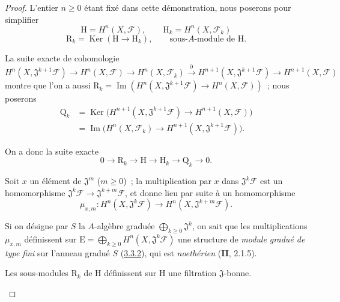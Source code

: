 \begin{proof}
L'entier $n\geq0$ étant fixé dans cette démonstration, nous poserons pour
simplifier
\[
\mathrm H=H^n(X,\mathcal F),\qquad
\mathrm H_k=H^n(X,\mathcal F_k)
\tag{4.1.7.3}\label{III.4.1.7.3-fr}
\]
\[
\mathrm R_k=\operatorname{Ker}(\mathrm H\longrightarrow\mathrm H_k),
\qquad\text{sous-$A$-module de $\mathrm H$.}
\tag{4.1.7.4}\label{III.4.1.7.4-fr}
\]

La suite exacte de cohomologie
\[
H^n(X,\mathfrak J^{k+1}\mathcal F)\longrightarrow H^n(X,\mathcal F)
\longrightarrow H^n(X,\mathcal F_k)\xrightarrow{\partial}
H^{n+1}(X,\mathfrak J^{k+1}\mathcal F)
\longrightarrow H^{n+1}(X,\mathcal F)
\]
montre que l'on a aussi
$\mathrm R_k=\operatorname{Im}(
H^n(X,\mathfrak J^{k+1}\mathcal F)\longrightarrow H^n(X,\mathcal F)
)$~;
nous poserons
\[
\begin{aligned}
\mathrm Q_k
&=\operatorname{Ker}\bigl(H^{n+1}(X,\mathfrak J^{k+1}\mathcal F)
\longrightarrow H^{n+1}(X,\mathcal F)\bigr)\\
&=\operatorname{Im}\bigl(H^n(X,\mathcal F_k)
\longrightarrow H^{n+1}(X,\mathfrak J^{k+1}\mathcal F)\bigr).
\end{aligned}
\tag{4.1.7.5}\label{III.4.1.7.5-fr}
\]

On a donc la suite exacte
\[
0\longrightarrow\mathrm R_k\longrightarrow\mathrm H
\longrightarrow\mathrm H_k\longrightarrow\mathrm Q_k\longrightarrow0.
\tag{4.1.7.6}\label{III.4.1.7.6-fr}
\]

\begin{env}[4.1.7.7]
\label{III.4.1.7.7-fr}
Soit $x$ un élément de $\mathfrak J^m$ ($m\geq0$)~; la multiplication par
$x$ dans $\mathfrak J^k\mathcal F$ est un homomorphisme
$\mathfrak J^k\mathcal F\to\mathfrak J^{k+m}\mathcal F$, et donne lieu
par suite à un homomorphisme
\[
\mu_{x,m}:H^n(X,\mathfrak J^k\mathcal F)
\longrightarrow H^n(X,\mathfrak J^{k+m}\mathcal F).
\tag{4.1.7.8}\label{III.4.1.7.8-fr}
\]

Si on désigne par $S$ la $A$-algèbre graduée
$\bigoplus_{k\geq0}\mathfrak J^k$, on sait que les multiplications
$\mu_{x,m}$ définissent sur
$\mathrm E=\bigoplus_{k\geq0}H^n(X,\mathfrak J^k\mathcal F)$ une
structure de \emph{module gradué de type fini} sur l'anneau gradué $S$
(\hyperref[III.3.3.2-fr]{3.3.2}), qui est \emph{noethérien} (\textbf{II}, 2.1.5).
\end{env}

\begin{lemma}[4.1.7.9]
\label{III.4.1.7.9-fr}
Les sous-modules $\mathrm R_k$ de $\mathrm H$ définissent sur $\mathrm H$
une filtration $\mathfrak J$-bonne.
\end{lemma}


\end{proof}
